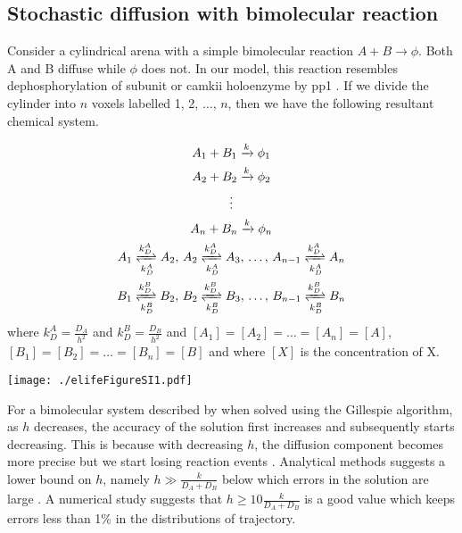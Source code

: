 \documentclass[9pt,lineno,doublespacing]{elife}
\begin{document}
\begin{appendixbox}
\subsection*{Stochastic diffusion with bimolecular reaction}\label{subsec:rdme}

Consider a cylindrical arena with a simple bimolecular reaction $A+B \rightarrow \phi$.
Both A and B diffuse while $\phi$ does not. In our model, this reaction
resembles dephosphorylation of subunit or \gls{camkii} holoenzyme by \gls{pp1} .
If we divide the cylinder into $n$ voxels labelled 1, 2, $\ldots$, $n$, then we
have the following resultant chemical system.

\begin{equation}
    \begin{gathered}
        A_1 + B_1 \xrightarrow{k} \phi_1 \\
        A_2 + B_2 \xrightarrow{k} \phi_2 \\
        \vdots \\
        A_n + B_n \xrightarrow{k} \phi_n \\
        A_1 \xrightleftharpoons[k_D^A]{k_D^A} A_2 ,\, A_2 \xrightleftharpoons[k_D^A]{k_D^A} A_3 
            ,\, \ldots,\, A_{n-1} \xrightleftharpoons[k_D^A]{k_D^A} A_n \\ 
        B_1 \xrightleftharpoons[k_D^B]{k_D^B} B_2 ,\, 
            B_2 \xrightleftharpoons[k_D^B]{k_D^B} B_3 ,\, 
            \ldots,\, B_{n-1} \xrightleftharpoons[k_D^B]{k_D^B} B_n \\ 
    \end{gathered}
    \label{eq:discrete}
\end{equation} where $k_D^A=\frac{D_A}{h^2}$ and $k_D^B=\frac{D_B}{h^2}$ and
$[A_1]=[A_2]=\ldots=[A_n]=[A]$, $[B_1]=[B_2]=\ldots=[B_n]=[B]$ 
and where $[X]$ is the concentration of X.

\begin{center}
\texttt{[image: ./elifeFigureSI1.pdf]}
\end{center}

For a bimolecular system described by  when solved using 
the Gillespie
algorithm, as $h$ decreases, the accuracy of the solution first increases 
and subsequently starts decreasing. This is because with decreasing $h$, 
the diffusion
component becomes more precise but we start losing reaction events
\citep{gardiner_correlations_1976}. Analytical methods suggests a lower bound on
$h$, namely $h\gg \frac{k}{D_A+D_B}$ below which errors in the solution are
large \citep{isaacson_reaction-diffusion_2009}. A numerical study
\citep{erban_stochastic_2009} suggests that $h\ge 10\frac{k}{D_A+D_B}$ is a good
value which keeps errors less than 1\% in the distributions of trajectory.


\end{appendixbox}
\end{document}
